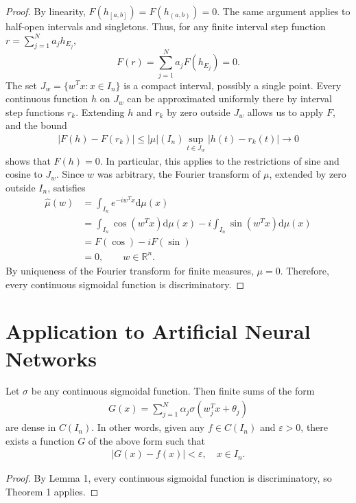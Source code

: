 \documentclass[12pt]{article}
\begin{document}
\begin{proof}
By linearity, $F(h_{[a,b]})=F(h_{(a,b)})=0$. The same argument applies to half-open intervals and singletons. Thus, for any finite interval step function $r=\sum_{j=1}^N a_j h_{E_j}$,
$$
F(r)=\sum_{j=1}^N a_jF(h_{E_j})=0.
$$
The set $J_w=\{w^Tx:x\in I_n\}$ is a compact interval, possibly a single point. Every continuous function $h$ on $J_w$ can be approximated uniformly there by interval step functions $r_k$. Extending $h$ and $r_k$ by zero outside $J_w$ allows us to apply $F$, and the bound
\begin{align*}
    |F(h)-F(r_k)|\leq |\mu|(I_n)\sup_{t\in J_w}|h(t)-r_k(t)|\longrightarrow0
\end{align*}
shows that $F(h)=0$. In particular, this applies to the restrictions of sine and cosine to $J_w$. Since $w$ was arbitrary, the Fourier transform of $\mu$, extended by zero outside $I_n$, satisfies
\begin{align*}
    \hat{\mu}(w)&=\int_{I_n} e^{-iw^Tx}\mathrm{d}\mu(x)\\
    &=\int_{I_n} \cos(w^Tx)\mathrm{d}\mu(x)-i\int_{I_n} \sin(w^Tx)\mathrm{d}\mu(x)\\
    &=F(\cos)-iF(\sin)\\
    &=0,\qquad w\in\mathbb{R}^n.
\end{align*}
By uniqueness of the Fourier transform for finite measures, $\mu=0$. Therefore, every continuous sigmoidal function is discriminatory.
\end{proof}

\section{Application to Artificial Neural Networks}

\begin{mytheorem}
    Let $\sigma$ be any continuous sigmoidal function. Then finite sums of the form
\begin{align*}
G(x) = \sum_{j=1}^{N} \alpha_j \sigma(w_j^T x + \theta_j)
\end{align*}
are dense in $C(I_n)$. In other words, given any $f \in C(I_n)$ and $\varepsilon > 0$, there exists a function $G$ of the above form such that
\begin{align*}
|G(x) - f(x)| < \varepsilon, \quad x \in I_n.
\end{align*}
\end{mytheorem}

\begin{proof}
    By Lemma 1, every continuous sigmoidal function is discriminatory, so Theorem 1 applies.
\end{proof}
\end{document}
